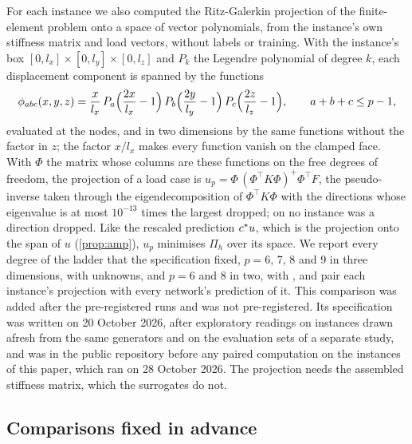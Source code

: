 For each instance we also computed the Ritz-Galerkin projection of the finite-element
problem onto a space of vector polynomials, from the instance's own stiffness matrix and
load vectors, without labels or training. With the instance's box
$[0,l_x]\times[0,l_y]\times[0,l_z]$ and $P_k$ the Legendre polynomial of degree $k$, each
displacement component is spanned by the functions
\begin{equation}
\phi_{abc}(x,y,z)=\frac{x}{l_x}\,P_a\Bigl(\frac{2x}{l_x}-1\Bigr)\,P_b\Bigl(\frac{2y}{l_y}-1\Bigr)\,
P_c\Bigl(\frac{2z}{l_z}-1\Bigr),\qquad a+b+c\le p-1,
\label{eq:ritzbasis}
\end{equation}
evaluated at the nodes, and in two dimensions by the same functions without the factor in
$z$; the factor $x/l_x$ makes every function vanish on the clamped face. With $\Phi$ the
matrix whose columns are these functions on the free degrees of freedom, the projection of a
load case is $u_p=\Phi\,(\Phi^{\top}K\Phi)^{+}\Phi^{\top}F$, the pseudo-inverse taken
through the eigendecomposition of $\Phi^{\top}K\Phi$ with the directions whose eigenvalue is
at most $10^{-13}$ times the largest dropped; on no instance was a direction dropped. Like
the rescaled prediction $c^{\ast} u$, which is the projection onto the span of $u$
(\cref{prop:amp}), $u_p$ minimises $\Pi_h$ over its space. We report every degree of the
ladder that the specification fixed, $p=6$, 7, 8 and 9 in three dimensions, with
\numRitzThreeK{} unknowns, and $p=6$ and 8 in two, with \numRitzTwoK{}, and pair each
instance's projection with every network's prediction of it. This comparison was added after
the pre-registered runs and was not pre-registered. Its specification was written on 20
October 2026, after exploratory readings on instances drawn afresh from the same generators
and on the evaluation sets of a separate study, and was in the public repository before any
paired computation on the instances of this paper, which ran on 28 October 2026. The
projection needs the assembled stiffness matrix, which the surrogates do not.

\subsection{Comparisons fixed in advance}\label{sec:methods:prereg}

